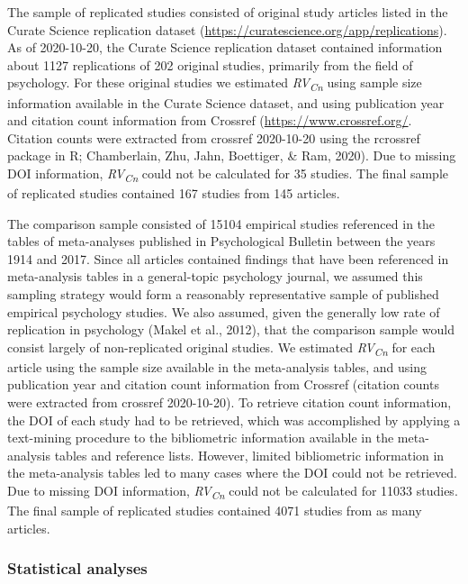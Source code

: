 \documentclass[
  english,
  jou,floatsintext]{apa6}
\begin{document}
The sample of replicated studies consisted of original study articles listed in the Curate Science replication dataset (\url{https://curatescience.org/app/replications}). As of 2020-10-20, the Curate Science replication dataset contained information about 1127 replications of 202 original studies, primarily from the field of psychology. For these original studies we estimated \emph{RV\textsubscript{Cn}} using sample size information available in the Curate Science dataset, and using publication year and citation count information from Crossref (\url{https://www.crossref.org/}. Citation counts were extracted from crossref 2020-10-20 using the rcrossref package in R; Chamberlain, Zhu, Jahn, Boettiger, \& Ram, 2020). Due to missing DOI information, \emph{RV\textsubscript{Cn}} could not be calculated for 35 studies. The final sample of replicated studies contained 167 studies from 145 articles.

The comparison sample consisted of 15104 empirical studies referenced in the tables of meta-analyses published in Psychological Bulletin between the years 1914 and 2017. Since all articles contained findings that have been referenced in meta-analysis tables in a general-topic psychology journal, we assumed this sampling strategy would form a reasonably representative sample of published empirical psychology studies. We also assumed, given the generally low rate of replication in psychology (Makel et al., 2012), that the comparison sample would consist largely of non-replicated original studies. We estimated \emph{RV\textsubscript{Cn}} for each article using the sample size available in the meta-analysis tables, and using publication year and citation count information from Crossref (citation counts were extracted from crossref 2020-10-20). To retrieve citation count information, the DOI of each study had to be retrieved, which was accomplished by applying a text-mining procedure to the bibliometric information available in the meta-analysis tables and reference lists. However, limited bibliometric information in the meta-analysis tables led to many cases where the DOI could not be retrieved. Due to missing DOI information, \emph{RV\textsubscript{Cn}} could not be calculated for 11033 studies. The final sample of replicated studies contained 4071 studies from as many articles.\\

\hypertarget{statistical-analyses}{%
\subsubsection{Statistical analyses}\label{statistical-analyses}}
\end{document}
